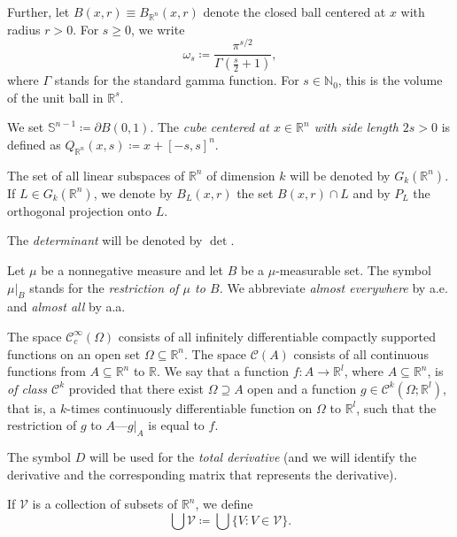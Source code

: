 \documentclass[pdflatex,sn-mathphys-num]{sn-jnl}
\theoremstyle{plain}
\theoremstyle{definition}
\begin{document}
Further, let $B(x, r)\equiv B_{\mathbb{R}^n}(x, r)$ denote the closed ball centered at $x$ with radius $r>0$. For $s\geq0$, we write
$$\omega_s\coloneq \frac{\pi^{s/2}}{\Gamma\left(\frac{s}{2}+1\right)},$$ where $\Gamma$ stands for the standard gamma function. For $s\in\mathbb{N}_0$, this is the volume of the unit ball in
$\mathbb R^s$. 

We set $\mathbb{S}^{n-1}\coloneq\partial B(0, 1).$ The \emph{cube centered at $x\in\mathbb{R}^n$ with side length $2s>0$} is defined as $Q_{{\mathbb{R}^n}}(x, s)\coloneq x+[-s, s]^n$. 

The set of all linear subspaces of
$\mathbb{R}^n$ of dimension $k$ will be denoted by $G_k(\mathbb{R}^n).$ If $L\in G_k(\mathbb{R}^n)$, we denote by $B_L(x, r)$ the set $B(x, r)\cap L$ and by $P_{L}$ the orthogonal projection onto $L$.

The \emph{determinant} will be denoted by $\det$. 



 Let $\mu$ be a nonnegative measure and let $B$ be a $\mu$-measurable set. The symbol $\mu\big|_{B}$ stands for the \textit{restriction of $\mu$ to $B$.} We abbreviate \textit{almost everywhere} by a.e. and \textit{almost all} by a.a. 

 The space $\mathcal{C}^{\infty}_c(\Omega)$ consists of all infinitely differentiable compactly supported functions on an open set  $\Omega\subseteq\mathbb{R}^n$. The space $\mathcal{C}(A)$ consists of all continuous  functions from $A\subseteq\mathbb{R}^n$ to $\mathbb{R}$. We say that a function $f\colon A\to\mathbb{R}^l$, where $A\subseteq\mathbb{R}^n$, is \emph{of class $\mathcal{C}^k$} provided that there exist $\Omega\supseteq A$ open and a function $g\in\mathcal{C}^k(\Omega; \mathbb{R}^l)$, that is, a $k$-times continuously differentiable function on $\Omega$ to $\mathbb{R}^l$, such that the restriction of $g$ to $A$---$g|_{A}$ is equal to $f$.  

     
    The symbol $D$ will be used for the \textit{total derivative} (and we will identify the derivative and the corresponding matrix that represents the derivative).

    If $\mathcal{V}$ is a collection of subsets of $\mathbb{R}^n$, we define $$\bigcup\mathcal{V}\coloneq\bigcup\{V:V\in\mathcal{V}\}.$$
\end{document}
